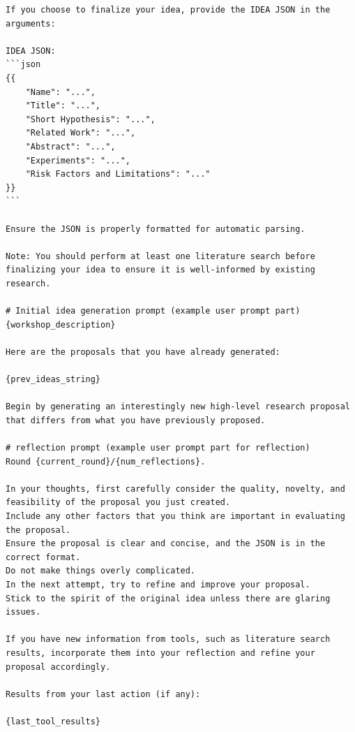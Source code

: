\begin{appendices}
\begin{tcolorbox}[breakable,colback=orange!5!white, colframe=orange!80!black, title=Generalized Idea Generation System and User Prompt]
\begin{Verbatim}[breaklines, breaksymbol={}, breaksymbolleft={}, fontsize=\small]
If you choose to finalize your idea, provide the IDEA JSON in the arguments:

IDEA JSON:
```json
{{
    "Name": "...",
    "Title": "...",
    "Short Hypothesis": "...",
    "Related Work": "...",
    "Abstract": "...",
    "Experiments": "...",
    "Risk Factors and Limitations": "..."
}}
```

Ensure the JSON is properly formatted for automatic parsing.

Note: You should perform at least one literature search before finalizing your idea to ensure it is well-informed by existing research.

# Initial idea generation prompt (example user prompt part)
{workshop_description}

Here are the proposals that you have already generated:

{prev_ideas_string}

Begin by generating an interestingly new high-level research proposal that differs from what you have previously proposed.

# reflection prompt (example user prompt part for reflection)
Round {current_round}/{num_reflections}.

In your thoughts, first carefully consider the quality, novelty, and feasibility of the proposal you just created.
Include any other factors that you think are important in evaluating the proposal.
Ensure the proposal is clear and concise, and the JSON is in the correct format.
Do not make things overly complicated.
In the next attempt, try to refine and improve your proposal.
Stick to the spirit of the original idea unless there are glaring issues.

If you have new information from tools, such as literature search results, incorporate them into your reflection and refine your proposal accordingly.

Results from your last action (if any):

{last_tool_results}
\end{Verbatim}
\end{tcolorbox}


\end{appendices}
